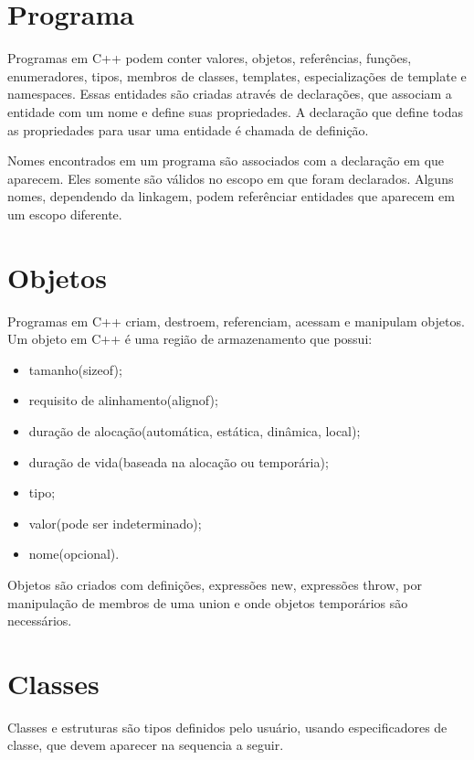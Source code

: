 \documentclass[rel_mlp]{iiufrgs}
\begin{document}
\section{Programa}
Programas em C++ podem conter valores, objetos, referências, funções, enumeradores, tipos, membros de classes, templates, especializações de template e namespaces. Essas entidades são criadas através de declarações, que associam a entidade com um nome e define suas propriedades. A declaração que define todas as propriedades para usar uma entidade é chamada de definição.

Nomes encontrados em um programa são associados com a declaração em que aparecem. Eles somente são válidos no escopo em que foram declarados. Alguns nomes, dependendo da linkagem, podem referênciar entidades que aparecem em um escopo diferente.

\section{Objetos}
Programas em C++ criam, destroem, referenciam, acessam e manipulam objetos. Um objeto em C++ é uma região de armazenamento que possui:
\begin{itemize}
	\item tamanho(sizeof);
	\item requisito de alinhamento(alignof);
	\item duração de alocação(automática, estática, dinâmica, local);
	\item duração de vida(baseada na alocação ou temporária);
	\item tipo;
	\item valor(pode ser indeterminado);
	\item nome(opcional).
\end{itemize}

Objetos são criados com definições, expressões new, expressões throw, por manipulação de membros de uma union e onde objetos temporários são necessários.

\section{Classes}
Classes e estruturas são tipos definidos pelo usuário, usando especificadores de classe, que devem aparecer na sequencia a seguir.
\end{document}
